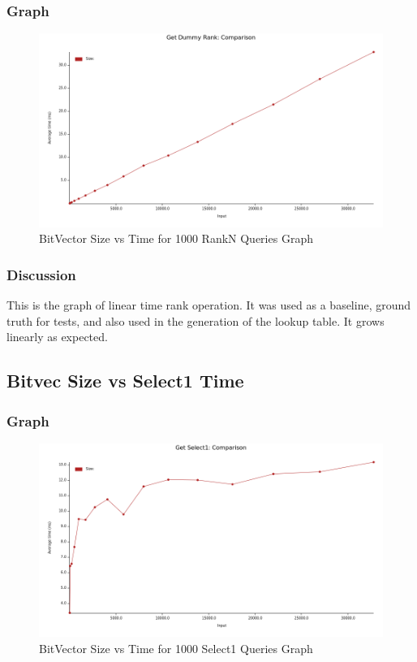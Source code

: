 \documentclass{report}
\begin{document}
\subsubsection*{Graph}
\begin{figure}[h!]
    \centering
    \includegraphics[scale=0.5]{get_dummy_rank_time.png}
    \caption{BitVector Size vs Time for 1000 RankN Queries Graph}
    \label{fig:my_label}
\end{figure}
\subsubsection*{Discussion}
This is the graph of linear time rank operation. It was used as a baseline, ground truth for tests, and also used in the generation of the lookup table. It grows linearly as expected.
\newpage


\subsection*{Bitvec Size vs Select1 Time}
\subsubsection*{Graph}
\begin{figure}[h!]
    \centering
    \includegraphics[scale=0.5]{get_select1_time.png}
    \caption{BitVector Size vs Time for 1000 Select1 Queries Graph}
    \label{fig:my_label}
\end{figure}
\end{document}
